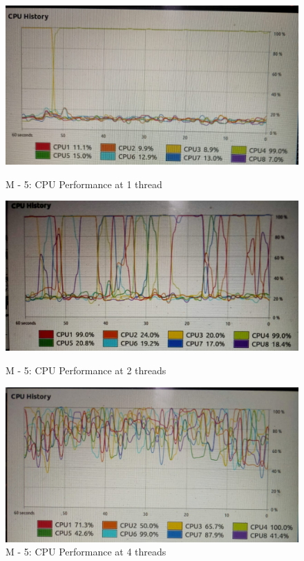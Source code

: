 \documentclass[paper=a4, fontsize = 12pt]{scrartcl}
\numberwithin{equation}{section}		%
\numberwithin{figure}{section}			%
\numberwithin{table}{section}				%
\begin{document}
\begin{figure}[H]
    \centering
    \captionsetup{justification=centering,margin=2cm}
    
    \includegraphics[width = 14cm]{5_1.jpeg}
    \caption{M - 5: CPU Performance at 1 thread}
    \label{fig:M5CPUT1}
    
    \includegraphics[width = 14cm]{5_2.jpeg}
    \caption{M - 5: CPU Performance at 2 threads}
    \label{fig:M5CPUT2}
    
    \includegraphics[width = 14cm]{5_4.jpeg}
    \caption{M - 5: CPU Performance at 4 threads}
    \label{fig:M5CPUT4}
\end{figure}
\end{document}
